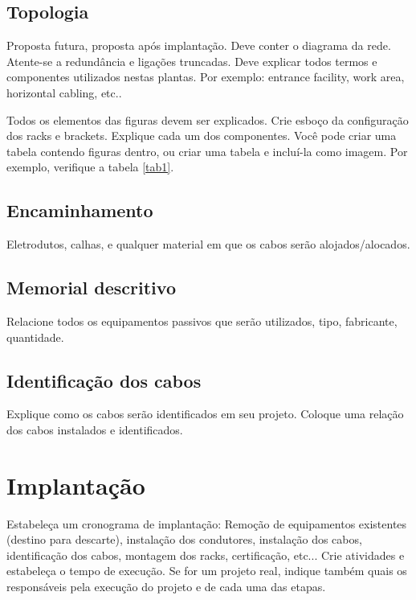 \documentclass[	DIV=calc,%
							paper=a4,%
							fontsize=12pt,%
							onecolumn]{scrartcl}	 					%
\begin{document}
\clearpage
{}
\recalctypearea











\subsection{Topologia}
Proposta futura, proposta após implantação.
Deve conter o diagrama da rede. Atente-se a redundância  e ligações truncadas.
Deve explicar todos termos e componentes utilizados nestas plantas. Por exemplo: entrance facility, work area, horizontal cabling, etc..

Todos os elementos das figuras devem ser explicados. 
Crie esboço da configuração dos racks e brackets. Explique cada um dos componentes. Você pode criar uma tabela contendo figuras dentro, ou criar uma tabela e incluí-la como imagem. Por exemplo, verifique a tabela \ref{tab1}.



\subsection{Encaminhamento}
Eletrodutos, calhas, e qualquer material em que os cabos serão alojados/alocados.

\subsection{Memorial descritivo}

Relacione todos os equipamentos passivos que serão utilizados, tipo, fabricante, quantidade.

\subsection{Identificação dos cabos}
Explique como os cabos serão identificados em seu projeto. Coloque uma relação dos cabos instalados e identificados.

\section{Implantação}
Estabeleça um cronograma de implantação:
Remoção de equipamentos existentes (destino para descarte), instalação dos condutores, instalação dos cabos, 
identificação dos cabos, montagem dos racks, certificação, etc... Crie atividades e estabeleça o tempo de execução. Se for um projeto real, indique também quais os responsáveis pela execução do projeto e de cada uma das etapas.
\end{document}
